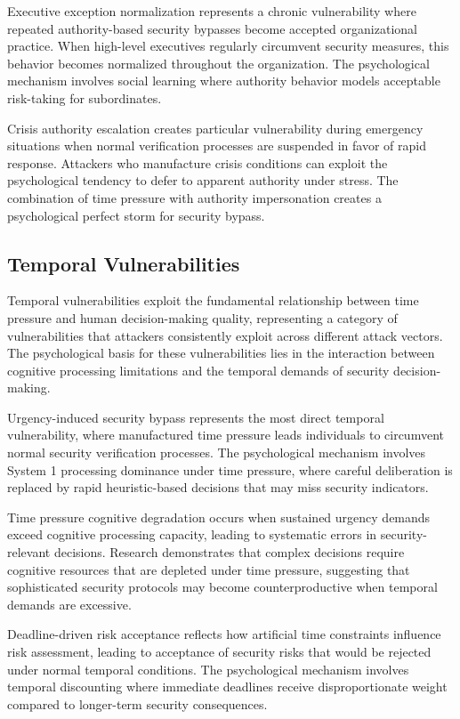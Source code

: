 \documentclass[11pt,a4paper]{article}
\begin{document}
Executive exception normalization represents a chronic vulnerability where repeated authority-based security bypasses become accepted organizational practice. When high-level executives regularly circumvent security measures, this behavior becomes normalized throughout the organization. The psychological mechanism involves social learning where authority behavior models acceptable risk-taking for subordinates.

Crisis authority escalation creates particular vulnerability during emergency situations when normal verification processes are suspended in favor of rapid response. Attackers who manufacture crisis conditions can exploit the psychological tendency to defer to apparent authority under stress. The combination of time pressure with authority impersonation creates a psychological perfect storm for security bypass.

\subsection{Temporal Vulnerabilities}

Temporal vulnerabilities exploit the fundamental relationship between time pressure and human decision-making quality, representing a category of vulnerabilities that attackers consistently exploit across different attack vectors. The psychological basis for these vulnerabilities lies in the interaction between cognitive processing limitations and the temporal demands of security decision-making.

Urgency-induced security bypass represents the most direct temporal vulnerability, where manufactured time pressure leads individuals to circumvent normal security verification processes. The psychological mechanism involves System 1 processing dominance under time pressure, where careful deliberation is replaced by rapid heuristic-based decisions that may miss security indicators.

Time pressure cognitive degradation occurs when sustained urgency demands exceed cognitive processing capacity, leading to systematic errors in security-relevant decisions. Research demonstrates that complex decisions require cognitive resources that are depleted under time pressure, suggesting that sophisticated security protocols may become counterproductive when temporal demands are excessive.

Deadline-driven risk acceptance reflects how artificial time constraints influence risk assessment, leading to acceptance of security risks that would be rejected under normal temporal conditions. The psychological mechanism involves temporal discounting where immediate deadlines receive disproportionate weight compared to longer-term security consequences.
\end{document}
